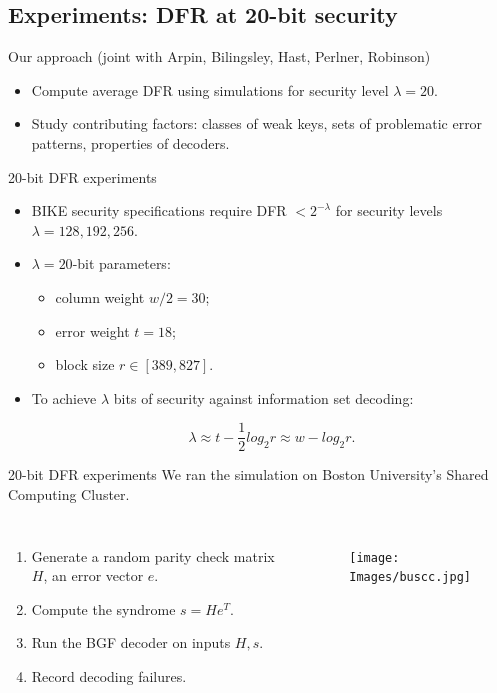 \subsection{Experiments: DFR at 20-bit security}


\begin{frame}{Our approach (joint with Arpin, Bilingsley, Hast, Perlner, Robinson) }
    \begin{itemize}
        \item Compute average DFR using simulations for security level $\lambda= 20$.
        \item Study contributing factors: classes of weak keys, sets of problematic error patterns, properties of decoders.
    \end{itemize}
\end{frame}



\begin{frame}{20-bit DFR experiments}
        \begin{itemize}
        \item BIKE security specifications require DFR $< 2^{-\lambda}$ for security levels $\lambda = 128,192,256$.
        \item $\lambda = 20$-bit parameters:
        \begin{itemize}
            \item column weight $w/2 = 30$;
            \item error weight $t = 18$;
            \item block size $r \in [389,827]$.
        \end{itemize}
        \item To achieve $\lambda$ bits of security against information set decoding:
        
        \[\lambda \approx t - \frac{1}{2}log_2 r \approx w - log_2 r.
        \]
    \end{itemize}
\end{frame}

\begin{frame}{20-bit DFR experiments}
We ran the simulation on Boston University's Shared Computing Cluster.

\begin{columns}

\begin{enumerate}
    \item Generate a random parity check matrix $H$, an error vector $e$.
    \item Compute the syndrome $s = He^T$.
    \item Run the BGF decoder on inputs $H,s$.
    \item Record decoding failures.
\end{enumerate}

\begin{figure}
    \centering
    \texttt{[image: Images/buscc.jpg]}
\end{figure}
\end{columns}

\end{frame}

